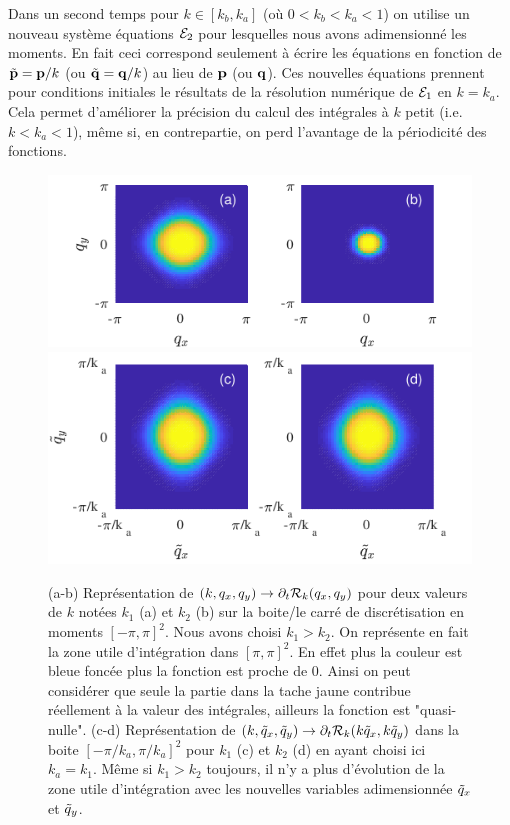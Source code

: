\documentclass[10.5pt]{article}
\begin{document}
\begin{multicols}{2}
Dans un second temps pour $k \in [k_b, k_a]$ (où $ 0 < k_b < k_a < 1$) on utilise un nouveau système équations $\mathcal{E}_2$ pour lesquelles nous avons adimensionné les moments. En fait ceci correspond seulement à écrire les équations en fonction de $\tilde{{\bf p}} = {\bf p}/k$ (ou $\tilde{{\bf q}} = {\bf q}/k$) au lieu de ${\bf p}$ (ou ${\bf q}$). Ces nouvelles équations prennent pour conditions initiales le résultats de la résolution numérique de $\mathcal{E}_1$ en $k = k_a$. Cela permet d'améliorer la précision du calcul des intégrales à $k$ petit (i.e. $k < k_a < 1$), même si, en contrepartie, on perd l'avantage de la périodicité des fonctions. \\
\begin{figure}[H]
\begin{center}
	\includegraphics[width=0.95\columnwidth]{DerRegIsing.pdf}
	\includegraphics[width=0.95\columnwidth, height = 0.4\columnwidth]{DerRegIsing2.pdf}
\end{center}
\caption{(a-b) Représentation  de $(k, q_x, q_y) \to \partial_t \mathcal{R}_k(q_x, q_y)$ pour deux valeurs de  $k$ notées $k_1$ (a) et $k_2$ (b) sur la boite/le carré de discrétisation en moments $[-\pi, \pi]^2$. Nous avons choisi $k_1>k_2$. On représente en fait la zone utile d'intégration dans $[\pi, \pi]^2$. En effet plus la couleur est bleue foncée plus la fonction est proche de 0. Ainsi on peut considérer que seule la partie dans la tache jaune contribue réellement à la valeur des intégrales, ailleurs la fonction est "quasi-nulle". (c-d) Représentation de $(k, \tilde{q}_x, \tilde{q}_y) \to \partial_t \mathcal{R}_k(k\tilde{q}_x, k\tilde{q}_y)$ dans la boite $[-\pi/k_a, \pi/k_a]^2$ pour  $k_1$ (c) et $k_2$ (d) en ayant choisi ici $k_a = k_1$. Même si $k_1>k_2$ toujours, il n'y a plus d'évolution de la zone utile d'intégration avec les nouvelles variables adimensionnée $\tilde{q}_x$ et $\tilde{q}_y$.}

\end{figure}
\end{multicols}
\end{document}
